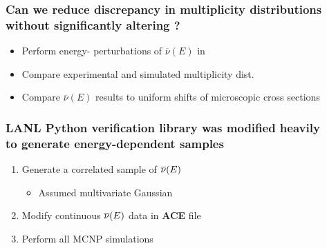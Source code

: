 \begin{frame}
\frametitle{Can we reduce discrepancy in multiplicity distributions \\ without significantly
altering \keff?}
{\addtolength\leftmargini{-0.2in}
 \addtolength\wideitemsep{0.1in}
\begin{itemize}
    \item[] Perform energy- perturbations of $\overline{\nu}(E)$  in
         \\ 
    \item[] Compare experimental and simulated multiplicity dist. 
            \\ 
        \item[] Compare $\overline{\nu}(E)$ results to uniform shifts of
		microscopic cross sections 
	\end{itemize}	
}
\end{frame} 











\begin{frame}
\frametitle{LANL Python verification library was modified heavily \\ to generate energy-dependent \nubar  samples}
{\addtolength\wideitemsep{0.2in}
\begin{enumerate}
	\item Generate a correlated sample of $\overline{\nu}(E)$ 
        \begin{itemize}\vspace{0.1in}
            \item {Assumed multivariate
                    Gaussian \\ }
    \end{itemize}
  \item Modify continuous $\overline{\nu}(E)$ data in \textbf{ACE} file 
  \item Perform all MCNP simulations \\ 
\end{enumerate} 
}
\end{frame} 




